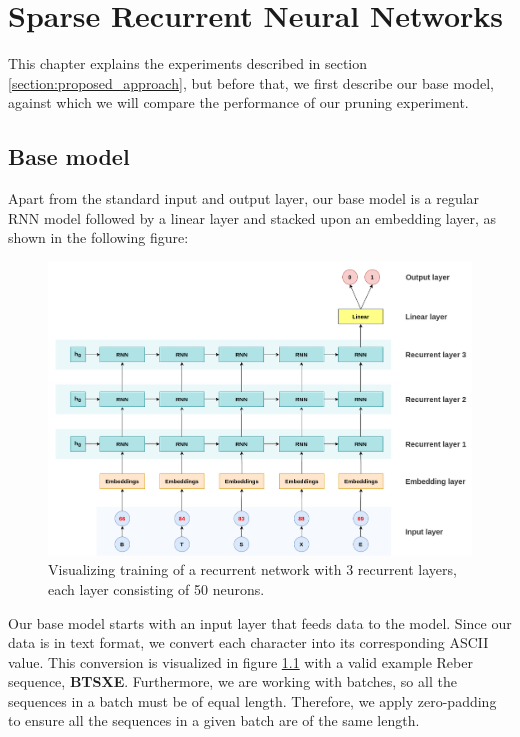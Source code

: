 \chapter{Sparse Recurrent Neural Networks}\label{chap:experiments}
This chapter explains the experiments described in section \ref{section:proposed_approach}, but before that, we first describe our base model, against which we will compare the performance of our pruning experiment.


\section{Base model}\label{section:training_rnn}
Apart from the standard input and output layer, our base model is a regular RNN model followed by a linear layer and stacked upon an embedding layer, as shown in the following figure:

\begin{figure}[h]
	\centering
	\includegraphics[width=0.85\linewidth]{images/experiments/training_rnn.png}
	\caption[Training recurrent networks]%
	{Visualizing training of a recurrent network with 3 recurrent layers, each layer consisting of 50 neurons.}
	\label{fig:training_rnn}
\end{figure}

Our base model starts with an input layer that feeds data to the model. Since our data is in text format, we convert each character into its corresponding ASCII value. This conversion is visualized in figure \ref{fig:training_rnn} with a valid example Reber sequence, \textbf{BTSXE}. Furthermore, we are working with batches, so all the sequences in a batch must be of equal length. Therefore, we apply zero-padding to ensure all the sequences in a given batch are of the same length.

